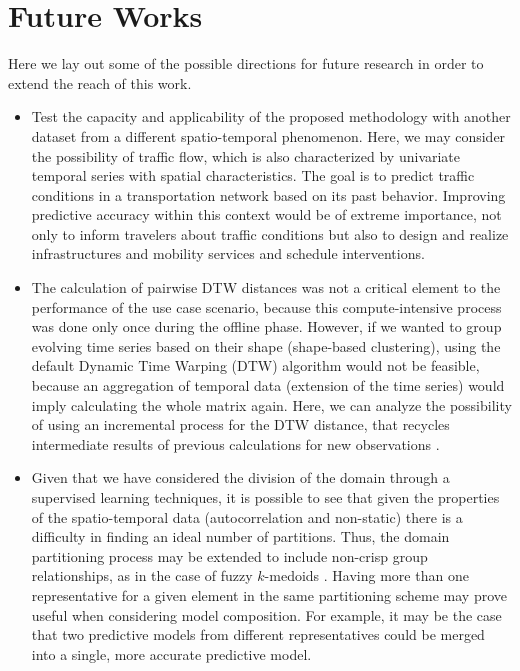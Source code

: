 \section{Future Works}

Here we lay out some of the possible directions for future research in order to extend the reach of this work.

\begin{itemize}
    
    \item Test the capacity and applicability of the proposed methodology with another dataset from a different spatio-temporal phenomenon. Here, we may consider the possibility of traffic flow, which is also characterized by univariate temporal series with spatial characteristics. The goal is to predict traffic conditions in a transportation network based on its past behavior. Improving predictive accuracy within this context would be of extreme importance, not only to inform travelers about traffic conditions but also to design and realize infrastructures and mobility services and schedule interventions.
    
    \item The calculation of pairwise DTW distances was not a critical element to the performance of the use case scenario, because this compute-intensive process was done only once during the offline phase. However, if we wanted to group evolving time series based on their shape (shape-based clustering), using the default Dynamic Time Warping (DTW) algorithm would not be feasible, because an aggregation of temporal data (extension of the time series) would imply calculating the whole matrix again. Here, we can analyze the possibility of using an incremental process for the DTW distance, that recycles intermediate results of previous calculations for new observations \cite{Oregi2017}.
    
    \item Given that we have considered the division of the domain through a supervised learning techniques, it is possible to see that given the properties of the spatio-temporal data (autocorrelation and non-static) there is a difficulty in finding an ideal number of partitions. Thus, the domain partitioning process may be extended to include non-crisp group relationships, as in the case of fuzzy $k$-medoids \cite{Izakian2015}. Having more than one representative for a given element in the same partitioning scheme may prove useful when considering model composition. For example, it may be the case that two predictive models from different representatives could be merged into a single, more accurate predictive model.


\end{itemize}
